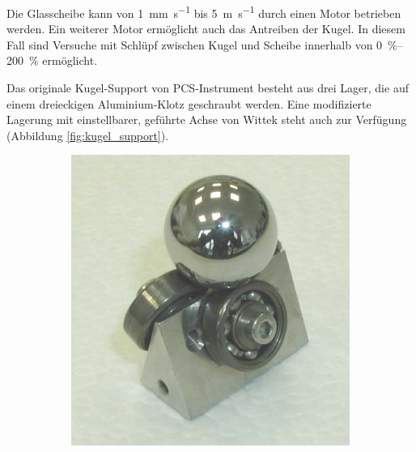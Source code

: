 Die Glasscheibe kann von \SI{1}{\milli\meter\per\second} bis \SI{5}{\meter\per\second} durch einen Motor betrieben werden.
Ein weiterer Motor ermöglicht auch das Antreiben der Kugel.
In diesem Fall sind Versuche mit Schlüpf zwischen Kugel und Scheibe innerhalb von \SIrange{0}{200}{\percent} ermöglicht.

Das originale Kugel-Support von PCS-Instrument besteht aus drei Lager, die auf einem dreieckigen Aluminium-Klotz geschraubt werden.
Eine modifizierte Lagerung mit einstellbarer, geführte Achse von Wittek \cite{wittek_2007} steht auch zur Verfügung (Abbildung \ref{fig:kugel_support}).
\begin{figure}[htb]
    \centering

    \begin{subfigure}[b]{0.3\textwidth}
        \includegraphics[width=\textwidth]{./images/kugel-support_original.png}
    \end{subfigure}
    \begin{subfigure}[b]{0.3\textwidth}

\end{subfigure}
\end{figure}
